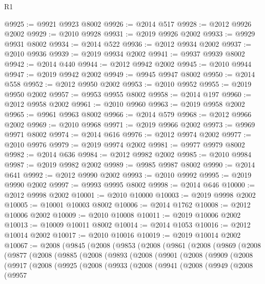\begin{lexlean}{R1}
\begin{coremodule}
@9925 := @9921 @9923 @8002
@9926 := @2014 @517
@9928 := @2012 @9926 @2002
@9929 := @2010 @9928
@9931 := @2019 @9926 @2002
@9933 := @9929 @9931 @8002
@9934 := @2014 @522
@9936 := @2012 @9934 @2002
@9937 := @2010 @9936
@9939 := @2019 @9934 @2002
@9941 := @9937 @9939 @8002
@9942 := @2014 @440
@9944 := @2012 @9942 @2002
@9945 := @2010 @9944
@9947 := @2019 @9942 @2002
@9949 := @9945 @9947 @8002
@9950 := @2014 @558
@9952 := @2012 @9950 @2002
@9953 := @2010 @9952
@9955 := @2019 @9950 @2002
@9957 := @9953 @9955 @8002
@9958 := @2014 @197
@9960 := @2012 @9958 @2002
@9961 := @2010 @9960
@9963 := @2019 @9958 @2002
@9965 := @9961 @9963 @8002
@9966 := @2014 @579
@9968 := @2012 @9966 @2002
@9969 := @2010 @9968
@9971 := @2019 @9966 @2002
@9973 := @9969 @9971 @8002
@9974 := @2014 @616
@9976 := @2012 @9974 @2002
@9977 := @2010 @9976
@9979 := @2019 @9974 @2002
@9981 := @9977 @9979 @8002
@9982 := @2014 @636
@9984 := @2012 @9982 @2002
@9985 := @2010 @9984
@9987 := @2019 @9982 @2002
@9989 := @9985 @9987 @8002
@9990 := @2014 @641
@9992 := @2012 @9990 @2002
@9993 := @2010 @9992
@9995 := @2019 @9990 @2002
@9997 := @9993 @9995 @8002
@9998 := @2014 @646
@10000 := @2012 @9998 @2002
@10001 := @2010 @10000
@10003 := @2019 @9998 @2002
@10005 := @10001 @10003 @8002
@10006 := @2014 @1762
@10008 := @2012 @10006 @2002
@10009 := @2010 @10008
@10011 := @2019 @10006 @2002
@10013 := @10009 @10011 @8002
@10014 := @2014 @1053
@10016 := @2012 @10014 @2002
@10017 := @2010 @10016
@10019 := @2019 @10014 @2002
@10067 := @2008
    (@9845
      (@2008
        (@9853
          (@2008
            (@9861
              (@2008
                (@9869
                  (@2008
                    (@9877
                      (@2008
                        (@9885
                          (@2008
                            (@9893
                              (@2008
                                (@9901
                                  (@2008
                                    (@9909
                                      (@2008
                                        (@9917
                                          (@2008
                                            (@9925
                                              (@2008
                                                (@9933
                                                  (@2008
                                                    (@9941
                                                      (@2008
                                                        (@9949
                                                          (@2008
                                                            (@9957

\end{coremodule}
\end{lexlean}
